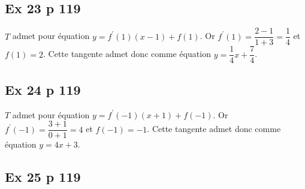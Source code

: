 \documentclass[12pt,a4paper]{book}
\begin{document}
\subsection*{Ex 23 p 119}
$T$ admet pour équation $y=f^{\prime}(1)(x-1)+f(1)$. Or $f^{\prime}(1)=\dfrac{2-1}{1+3}=\dfrac{1}{4}$ et $f(1)=2$. Cette tangente admet donc comme équation $y=\dfrac{1}{4} x+\dfrac{7}{4}$.

\subsection*{Ex 24 p 119}

$T$ admet pour équation $y=f^{\prime}(-1)(x+1)+f(-1) .$ Or $f^{\prime}(-1)=\dfrac{3+1}{0+1}=4$ et $f(-1)=-1$.
Cette tangente admet donc comme équation $y=4 x+3$.

\subsection*{Ex 25 p 119}
\end{document}
